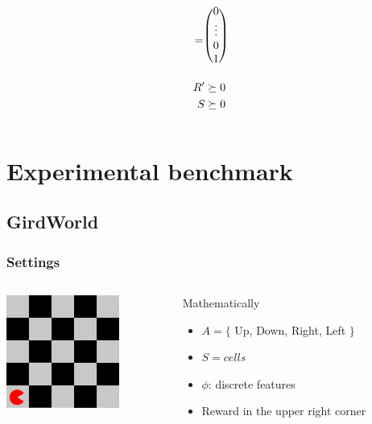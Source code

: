 \documentclass{beamer}
\begin{document}
\begin{frame}
\begin{columns}
\begin{column}{.45\textwidth}
\begin{block}
\begin{eqnarray*}
  = 
  \begin{blockarray}{(c)}
  \begin{block*}{c}
  0 \\
  \vdots \\
  0 \\
  1\\
  \end{block*}
  \end{block*}
  \end{blockarray}\\
  \label{C1.eqn}
  R'\succeq 0\\
  \label{C2.eqn}
  S \succeq 0
  \end{eqnarray*}

\end{block}
\end{column}
\end{columns}
\end{frame}
\section{Experimental benchmark}
\subsection{GirdWorld}
\label{sec-4_3}
\begin{frame}
\frametitle{Settings}
\label{sec-4_3_1}
\begin{columns}
\begin{column}{0.4\textwidth}
\label{sec-4_3_1_1}

\includegraphics[width=10em]{Expert001.png}
\end{column}
\begin{column}{0.4\textwidth}
\begin{block}{Mathematically}
\label{sec-4_3_1_2}
\begin{itemize}
\item $A = \{$ Up, Down, Right, Left $\}$
\item $S = {cells}$
\item $\phi$: discrete features
\item Reward in the upper right corner
\end{itemize}
\end{block}
\end{column}
\end{columns}
\end{frame}
\end{document}
